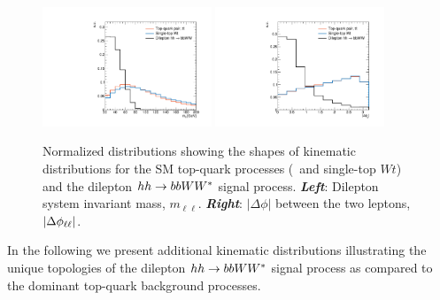 \begin{figure}[!htb]
    \begin{center}
        \includegraphics[width=0.45\textwidth]{figures/search_hh/signal_pheno/shape_plots/hh_shape_plot_mll}
        \includegraphics[width=0.45\textwidth]{figures/search_hh/signal_pheno/shape_plots/hh_shape_plot_dphi_ll}
        \caption{
            Normalized distributions showing the shapes of kinematic distributions for the SM
            top-quark processes (\ttbar~and single-top $Wt$) and the dilepton $hh \rightarrow bbWW^*$ signal process.
            \textit{\textbf{Left}}: Dilepton system invariant mass, $m_{\ell \ell}$.
            \textit{\textbf{Right}}: $|\Delta \phi|$ between the two leptons, $|\Delta \phi_{\ell\ell}|$.
        }
        \label{fig:hh_kin_1}
    \end{center}
\end{figure}

%
%

In the following we present additional kinematic distributions illustrating the unique topologies
of the dilepton $hh \rightarrow bbWW^*$ signal process as compared to the dominant top-quark background
processes.

